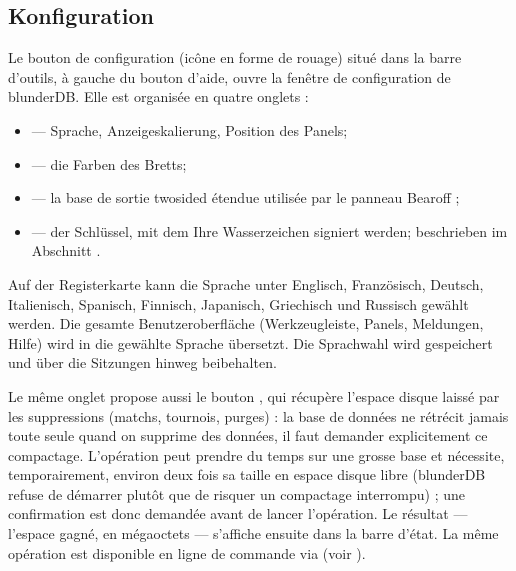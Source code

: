 \documentclass[letterpaper,10pt,german]{sphinxmanual}
\begin{document}
\subsection{Konfiguration}
\label{\detokenize{manuel:configuration}}\label{\detokenize{manuel:id2}}
\sphinxAtStartPar
Le bouton de configuration (icône en forme de rouage) situé dans la barre
d’outils, à gauche du bouton d’aide, ouvre la fenêtre de configuration de
blunderDB. Elle est organisée en quatre onglets :
\begin{itemize}
\item {} 
\sphinxAtStartPar
{} — Sprache, Anzeigeskalierung, Position des Panels;

\item {} 
\sphinxAtStartPar
{} — die Farben des Bretts;

\item {} 
\sphinxAtStartPar
{} — la base de sortie two\sphinxhyphen{}sided étendue utilisée par le panneau
Bearoff ;

\item {} 
\sphinxAtStartPar
{} — der Schlüssel, mit dem Ihre Wasserzeichen signiert werden; beschrieben im Abschnitt {\hyperref[\detokenize{manuel:diffusion-controlee}]{}}.

\end{itemize}

\sphinxAtStartPar
Auf der Registerkarte  kann die Sprache unter Englisch, Französisch, Deutsch, Italienisch, Spanisch, Finnisch, Japanisch, Griechisch und Russisch gewählt werden. Die gesamte Benutzeroberfläche (Werkzeugleiste, Panels, Meldungen, Hilfe) wird in die gewählte Sprache übersetzt. Die Sprachwahl wird gespeichert und über die Sitzungen hinweg beibehalten.

\sphinxAtStartPar
Le même onglet propose aussi le bouton , qui récupère
l’espace disque laissé par les suppressions (matchs, tournois, purges) : la
base de données ne rétrécit jamais toute seule quand on supprime des données,
il faut demander explicitement ce compactage. L’opération peut prendre du
temps sur une grosse base et nécessite, temporairement, environ deux fois sa
taille en espace disque libre (blunderDB refuse de démarrer plutôt que de
risquer un compactage interrompu) ; une confirmation est donc demandée avant
de lancer l’opération. Le résultat — l’espace gagné, en mégaoctets — s’affiche
ensuite dans la barre d’état. La même opération est disponible en ligne de
commande via  (voir {\hyperref[\detokenize{cli:cli}]{}}).
\end{document}
